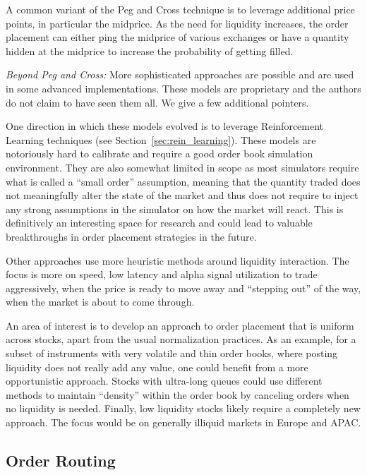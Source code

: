 A common variant of the Peg and Cross technique is to leverage additional price points, in particular the midprice. As the need for liquidity increases, the order placement can either ping the midprice of various exchanges or have a quantity hidden at the midprice to increase the probability of getting filled. \twomedskip


\noindent\emph{Beyond Peg and Cross:} More sophisticated approaches are possible and are used in some advanced implementations. These models are proprietary and the authors do not claim to have seen them all. We give a few additional pointers.


One direction in which these models evolved is to leverage Reinforcement Learning techniques (see Section~\ref{sec:rein_learning}). These models are notoriously hard to calibrate and require a good order book simulation environment. They are also somewhat limited in scope as most simulators require what is called a ``small order'' assumption, meaning that the quantity traded does not meaningfully alter the state of the market and thus does not require to inject any strong assumptions in the simulator on how the market will react. This is definitively an interesting space for research and could lead to valuable breakthroughs in order placement strategies in the future.


Other approaches use more heuristic methods around liquidity interaction. The focus is more on speed, low latency and alpha signal utilization to trade aggressively, when the price is ready to move away and ``stepping out'' of the way, when the market is about to come through.


An area of interest is to develop an approach to order placement that is uniform across stocks, apart from the usual normalization practices. As an example, for a subset of instruments with very volatile and thin order books, where posting liquidity does not really add any value, one could benefit from a more opportunistic approach. Stocks with ultra-long queues could use different methods to maintain ``density'' within the order book by canceling orders when no liquidity is needed. Finally, low liquidity stocks likely require a completely new approach. The focus would be on generally illiquid markets in Europe and APAC.


\subsection{Order Routing}

